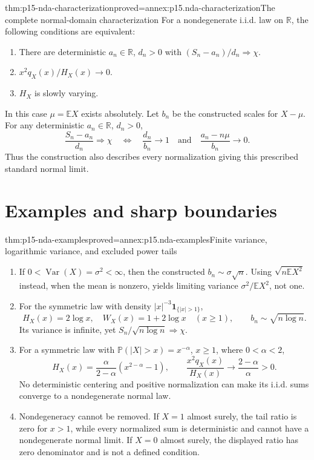 \begin{hbtheorem}{thm:p15-nda-characterization}{proved=annex:p15.nda-characterization}{The complete normal-domain characterization}
For a nondegenerate i.i.d. law on \(\mathbb R\), the following
conditions are equivalent:
\begin{enumerate}
\item There are deterministic \(a_n\in\mathbb R\), \(d_n>0\)
 with \((S_n-a_n)/d_n\Rightarrow\chi\).
\item \(x^2q_X(x)/H_X(x)\to0\).
\item \(H_X\) is slowly varying.
\end{enumerate}
In this case \(\mu=\mathbb EX\) exists absolutely. Let \(b_n\)
be the constructed scales for \(X-\mu\). For any deterministic
\(a_n\in\mathbb R\), \(d_n>0\),
\[
 \frac{S_n-a_n}{d_n}\Rightarrow\chi
 \quad\Longleftrightarrow\quad
 \frac{d_n}{b_n}\to1
 \quad\text{and}\quad
 \frac{a_n-n\mu}{b_n}\to0.
 \]
Thus the construction also describes every normalization giving
this prescribed standard normal limit.
\end{hbtheorem}

\section{Examples and sharp boundaries}
\label{sec:p15-nda-examples}

\begin{hbtheorem}{thm:p15-nda-examples}{proved=annex:p15.nda-examples}{Finite variance, logarithmic variance, and excluded power tails}
\begin{enumerate}
\item If \(0<\operatorname{Var}(X)=\sigma^2<\infty\), then
 the constructed \(b_n\sim\sigma\sqrt n\).
 Using \(\sqrt{n\mathbb EX^2}\) instead, when the mean is
 nonzero, yields limiting variance
 \(\sigma^2/\mathbb EX^2\), not one.
\item For the symmetric law with density
 \(|x|^{-3}\mathbf1_{\{|x|>1\}}\),
 \[
 H_X(x)=2\log x,\quad W_X(x)=1+2\log x\quad(x\geq1),
 \qquad b_n\sim\sqrt{n\log n}.
 \]
 Its variance is infinite, yet \(S_n/\sqrt{n\log n}\Rightarrow\chi\).
\item For a symmetric law with
 \(\mathbb P(|X|>x)=x^{-\alpha}\), \(x\geq1\), where
 \(0<\alpha<2\),
 \[
 H_X(x)=\frac{\alpha}{2-\alpha}(x^{2-\alpha}-1),\qquad
 \frac{x^2q_X(x)}{H_X(x)}\to\frac{2-\alpha}{\alpha}>0.
 \]
 No deterministic centering and positive normalization can make
 its i.i.d. sums converge to a nondegenerate normal law.
\item Nondegeneracy cannot be removed. If \(X=1\) almost surely,
 the tail ratio is zero for \(x>1\), while every normalized sum
 is deterministic and cannot have a nondegenerate normal limit.
 If \(X=0\) almost surely, the displayed ratio has zero denominator
 and is not a defined condition.
\end{enumerate}
\end{hbtheorem}

